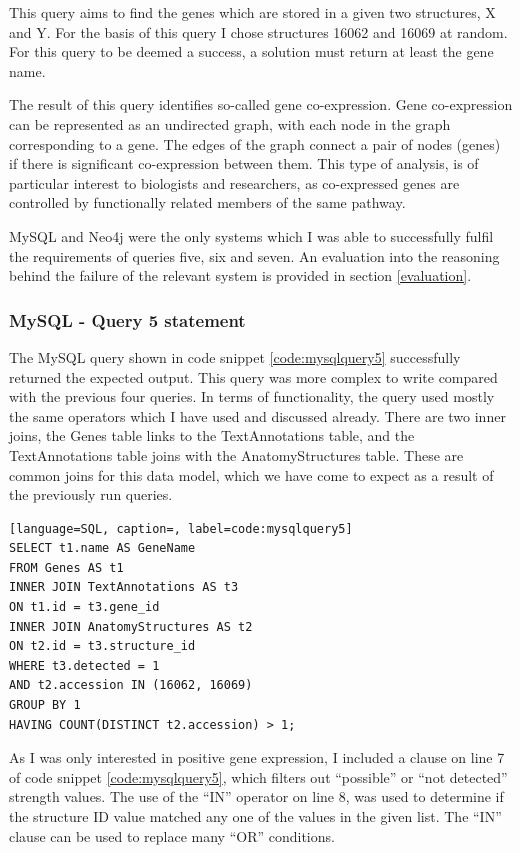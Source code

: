 This query aims to find the genes which are stored in a given two structures, X and Y. For the basis of this query I chose structures 16062 and 16069 at random. For this query to be deemed a success, a solution must return at least the gene name.

The result of this query identifies so-called gene co-expression. Gene co-expression can be represented as an undirected graph, with each node in the graph corresponding to a gene. The edges of the graph connect a pair of nodes (genes) if there is significant co-expression between them. This type of analysis, is of particular interest to biologists and researchers, as co-expressed genes are controlled by functionally related members of the same pathway.

MySQL and Neo4j were the only systems which I was able to successfully fulfil the requirements of queries five, six and seven. An evaluation into the reasoning behind the failure of the relevant system is provided in section \ref{evaluation}.

\subsubsection*{MySQL - Query 5 statement}\label{mysqlquery5statement}
The MySQL query shown in code snippet \ref{code:mysqlquery5} successfully returned the expected output. This query was more complex to write compared with the previous four queries. In terms of functionality, the query used mostly the same operators which I have used and discussed already. There are two inner joins, the Genes table links to the TextAnnotations table, and the TextAnnotations table joins with the AnatomyStructures table. These are common joins for this data model, which we have come to expect as a result of the previously run queries.

\begin{lstlisting}[language=SQL, caption=, label=code:mysqlquery5]
SELECT t1.name AS GeneName
FROM Genes AS t1
INNER JOIN TextAnnotations AS t3
ON t1.id = t3.gene_id
INNER JOIN AnatomyStructures AS t2
ON t2.id = t3.structure_id
WHERE t3.detected = 1
AND t2.accession IN (16062, 16069)
GROUP BY 1
HAVING COUNT(DISTINCT t2.accession) > 1;
\end{lstlisting}

As I was only interested in positive gene expression, I included a clause on line 7 of code snippet \ref{code:mysqlquery5}, which filters out ``possible'' or ``not detected'' strength values. The use of the ``IN'' operator on line 8, was used to determine if the structure ID value matched any one of the values in the given list. The ``IN'' clause can be used to replace many ``OR'' conditions.

